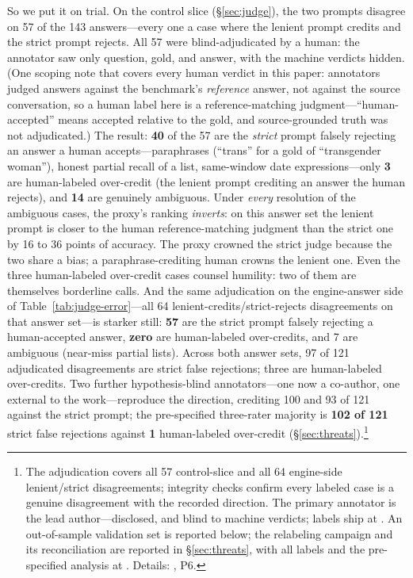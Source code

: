 \documentclass[11pt]{article}
\begin{document}
So we put it on trial. On the control slice (\S\ref{sec:judge}), the two prompts disagree on 57 of the 143 answers---every one a case where the lenient prompt credits and the strict prompt rejects. All 57 were blind-adjudicated by a human: the annotator saw only question, gold, and answer, with the machine verdicts hidden. (One scoping note that covers every human verdict in this paper: annotators judged answers against the benchmark's \emph{reference} answer, not against the source conversation, so a human label here is a reference-matching judgment---``human-accepted'' means accepted relative to the gold, and source-grounded truth was not adjudicated.) The result: \textbf{40} of the 57 are the \emph{strict} prompt falsely rejecting an answer a human accepts---paraphrases (``trans'' for a gold of ``transgender woman''), honest partial recall of a list, same-window date expressions---only \textbf{3} are human-labeled over-credit (the lenient prompt crediting an answer the human rejects), and \textbf{14} are genuinely ambiguous. Under \emph{every} resolution of the ambiguous cases, the proxy's ranking \emph{inverts}: on this answer set the lenient prompt is closer to the human reference-matching judgment than the strict one by 16 to 36 points of accuracy. The proxy crowned the strict judge because the two share a bias; a paraphrase-crediting human crowns the lenient one. Even the three human-labeled over-credit cases counsel humility: two of them are themselves borderline calls. And the same adjudication on the engine-answer side of Table~\ref{tab:judge-error}---all 64 lenient-credits/strict-rejects disagreements on that answer set---is starker still: \textbf{57} are the strict prompt falsely rejecting a human-accepted answer, \textbf{zero} are human-labeled over-credits, and 7 are ambiguous (near-miss partial lists). Across both answer sets, 97 of 121 adjudicated disagreements are strict false rejections; three are human-labeled over-credits. Two further hypothesis-blind annotators---one now a co-author, one external to the work---reproduce the direction, crediting 100 and 93 of 121 against the strict prompt; the pre-specified three-rater majority is \textbf{102 of 121} strict false rejections against \textbf{1} human-labeled over-credit (\S\ref{sec:threats}).\footnote{The adjudication covers all 57 control-slice and all 64 engine-side lenient/strict disagreements; integrity checks confirm every labeled case is a genuine disagreement with the recorded direction. The primary annotator is the lead author---disclosed, and blind to machine verdicts; labels ship at . An out-of-sample validation set is reported below; the relabeling campaign and its reconciliation are reported in \S\ref{sec:threats}, with all labels and the pre-specified analysis at . Details: , P6.}
\end{document}
